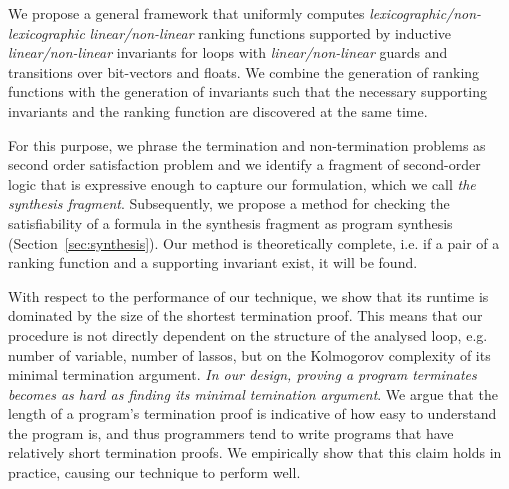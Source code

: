 \documentclass[preprint]{sigplanconf}
\theoremstyle{definition}
\newcommand{\todo}[1]{{\bf TODO:} #1}
\begin{document}




We propose a general framework that %
uniformly computes
\emph{lexicographic/non-lexicographic} \emph{linear/non-linear} 
ranking functions supported by inductive \emph{linear/non-linear} invariants for loops with 
\emph{linear/non-linear} guards and transitions over bit-vectors and floats.
We combine the generation of ranking functions with the generation of invariants such that the necessary 
supporting invariants and the ranking function are discovered at the same time.

 
For this purpose, we phrase the termination and non-termination problems as second order satisfaction problem and
we identify a fragment of second-order logic that is expressive enough to capture our formulation, 
which we call \emph{the synthesis fragment}. Subsequently, we propose a method 
for checking the satisfiability of a formula in the synthesis fragment as program synthesis (Section~\ref{sec:synthesis}). 
Our method is theoretically complete, i.e. if a pair of a ranking function and a supporting invariant 
exist, it will be found. 

With respect to the performance of our technique, we show that its runtime is dominated by the size of 
the shortest termination proof.
This means that our procedure is not directly dependent on the structure of the analysed loop, e.g. number of variable, number of lassos, 
but on the Kolmogorov complexity of its minimal termination argument. 
\emph{In our design, proving a program terminates becomes as hard as finding its minimal temination argument}.
We argue that the length of a program's termination proof is indicative of how easy to understand the program is, and thus 
programmers tend to write programs that have relatively short termination proofs. 
We empirically show that this claim holds in practice, causing our technique to perform well.
\end{document}
